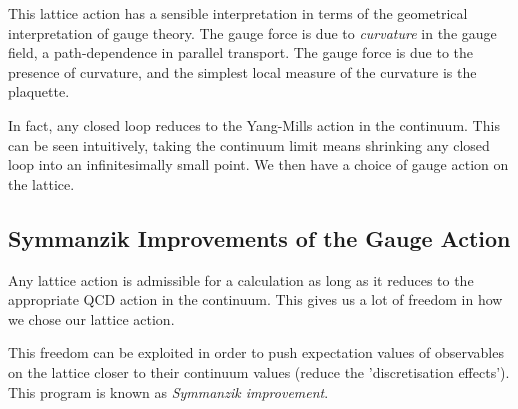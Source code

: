 This lattice action has a sensible interpretation in terms of the geometrical interpretation of gauge theory. The gauge force is due to {\it{curvature}} in the gauge field, a path-dependence in parallel transport. The gauge force is due to the presence of curvature, and the simplest local measure of the curvature is the plaquette.

In fact, any closed loop reduces to the Yang-Mills action in the continuum. This can be seen intuitively, taking the continuum limit means shrinking any closed loop into an infinitesimally small point. We then have a choice of gauge action on the lattice.

\subsection{Symmanzik Improvements of the Gauge Action}
\label{sec:symmanzik_gauge}

Any lattice action is admissible for a calculation as long as it reduces to the appropriate QCD action in the continuum. This gives us a lot of freedom in how we chose our lattice action. %

This freedom can be exploited in order to push expectation values of observables on the lattice closer to their continuum values (reduce the 'discretisation effects'). %
This program is known as {\it{Symmanzik improvement}}.

